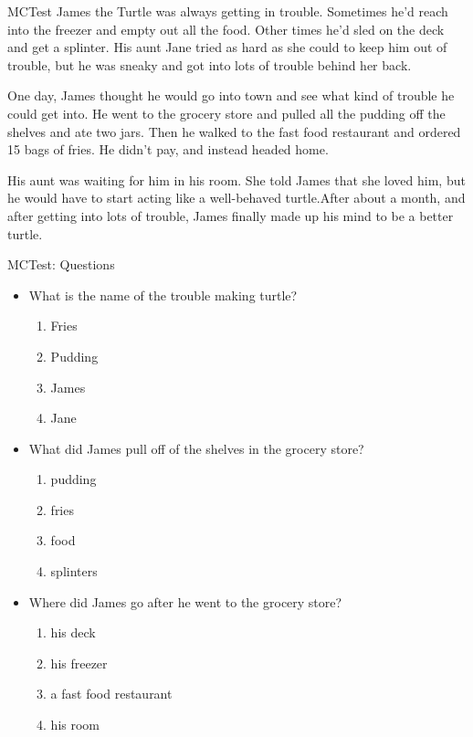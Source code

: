 \documentclass{beamer}
\begin{document}
\begin{frame}{MCTest}
  James the Turtle was always getting in trouble. Sometimes he'd reach into the freezer and empty out all the food. Other times he'd sled on the deck and get a splinter. His aunt Jane tried as hard as she could to keep him out of trouble, but he was sneaky and got into lots of trouble behind her back.

  One day, James thought he would go into town and see what kind of trouble he could get into. He went to the grocery store and pulled all the pudding off the shelves and ate two jars. Then he walked to the fast food restaurant and ordered 15 bags of fries. He didn't pay, and instead headed home.

  His aunt was waiting for him in his room. She told James that she loved him, but he would have to start acting like a well-behaved turtle.After about a month, and after getting into lots of trouble, James finally made up his mind to be a better turtle.

\end{frame}

\begin{frame}{MCTest: Questions}
  \begin{itemize}
   

  \item What is the name of the trouble making turtle?
    \begin{enumerate}
    \item Fries  \item Pudding \item James \item Jane
    \end{enumerate}
    \item What did James pull off of the shelves in the grocery store?
      \begin{enumerate}
      \item  pudding \item fries \item food \item splinters
      \end{enumerate}
    \item Where did James go after he went to the grocery store?
      \begin{enumerate}
      \item  his deck \item his freezer \item a fast food restaurant \item
        his room
      \end{enumerate}
  \end{itemize}
\end{frame}
\end{document}
